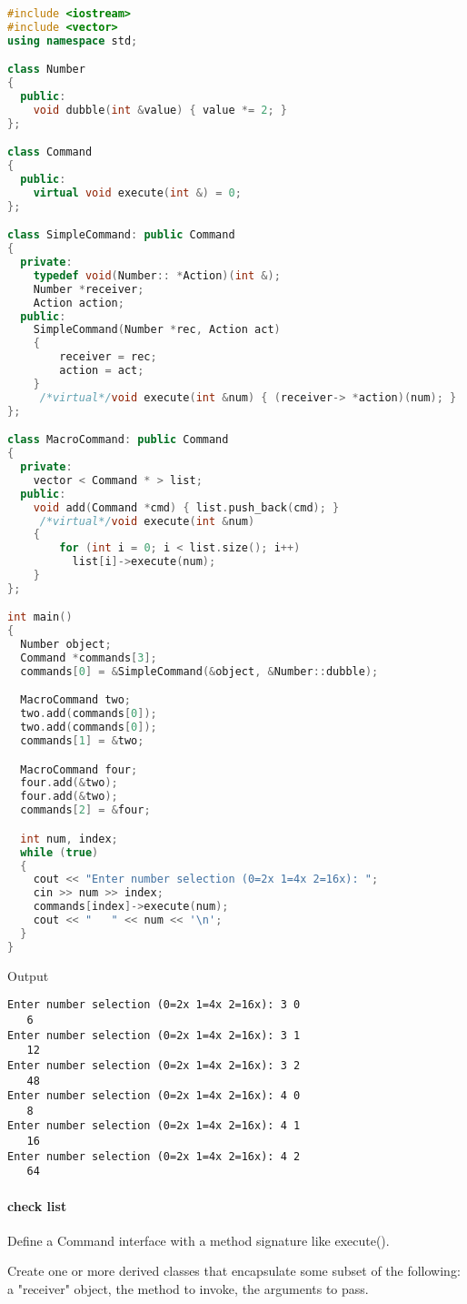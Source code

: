 \documentclass{book}
\begin{document}
\begin{lstlisting}[caption={Command Pattern example:macro }, language=C++]
#include <iostream>
#include <vector>
using namespace std;

class Number
{
  public:
    void dubble(int &value) { value *= 2; }
};

class Command
{
  public:
    virtual void execute(int &) = 0;
};

class SimpleCommand: public Command
{
  private:
    typedef void(Number:: *Action)(int &);
    Number *receiver;
    Action action;
  public:
    SimpleCommand(Number *rec, Action act)
    {
        receiver = rec;
        action = act;
    }
     /*virtual*/void execute(int &num) { (receiver-> *action)(num); }
};

class MacroCommand: public Command
{
  private:
    vector < Command * > list;
  public:
    void add(Command *cmd) { list.push_back(cmd); }
     /*virtual*/void execute(int &num)
    {
        for (int i = 0; i < list.size(); i++)
          list[i]->execute(num);
    }
};

int main()
{
  Number object;
  Command *commands[3];
  commands[0] = &SimpleCommand(&object, &Number::dubble);

  MacroCommand two;
  two.add(commands[0]);
  two.add(commands[0]);
  commands[1] = &two;

  MacroCommand four;
  four.add(&two);
  four.add(&two);
  commands[2] = &four;

  int num, index;
  while (true)
  {
    cout << "Enter number selection (0=2x 1=4x 2=16x): ";
    cin >> num >> index;
    commands[index]->execute(num);
    cout << "   " << num << '\n';
  }
}
\end{lstlisting}

Output
\begin{Verbatim}
Enter number selection (0=2x 1=4x 2=16x): 3 0
   6
Enter number selection (0=2x 1=4x 2=16x): 3 1
   12
Enter number selection (0=2x 1=4x 2=16x): 3 2
   48
Enter number selection (0=2x 1=4x 2=16x): 4 0
   8
Enter number selection (0=2x 1=4x 2=16x): 4 1
   16
Enter number selection (0=2x 1=4x 2=16x): 4 2
   64
\end{Verbatim}


\paragraph{check list}
    Define a Command interface with a method signature like execute().

    Create one or more derived classes that encapsulate some subset of the following: a "receiver" object, the method to invoke, the arguments to pass.
\end{document}
